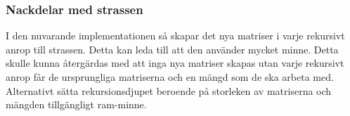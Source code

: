  \subsubsection{Nackdelar med strassen}
 I den nuvarande implementationen så skapar det nya matriser i varje rekursivt anrop till strassen. Detta kan leda till att den använder mycket minne. Detta skulle kunna återgärdas med att inga nya matriser skapas utan varje rekursivt anrop får de ursprungliga matriserna och en mängd som de ska arbeta med. Alternativt sätta rekursionsdjupet beroende på storleken av matriserna och mängden tillgängligt ram-minne.
 

 
 